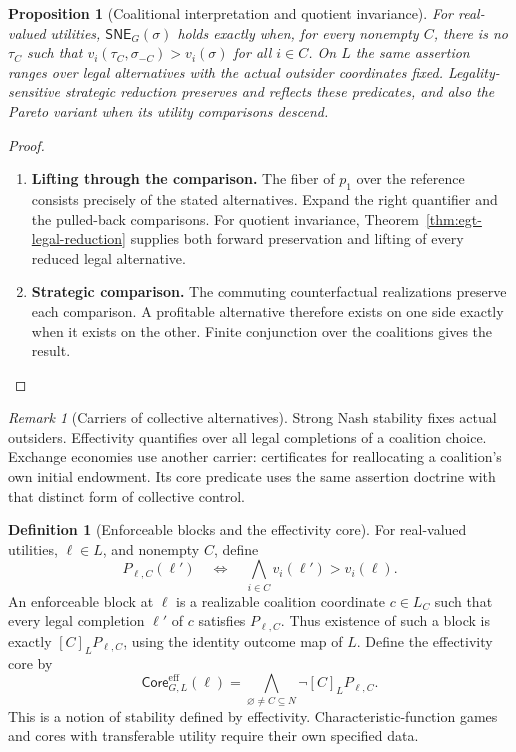 \documentclass[11pt,a4paper]{article}
\numberwithin{equation}{section}
\newtheorem{proposition}[theorem]{Proposition}
\theoremstyle{definition}
\newtheorem{definition}[theorem]{Definition}
\theoremstyle{remark}
\newtheorem{remark}[theorem]{Remark}
\theoremstyle{plain}
\begin{document}
\begin{proposition}[Coalitional interpretation and quotient invariance]
For real-valued utilities, $\mathsf{SNE}_G(\sigma)$ holds exactly when,
for every nonempty $C$, there is no $\tau_C$ such that
$v_i(\tau_C,\sigma_{-C})>v_i(\sigma)$ for all $i\in C$.
On $L$ the same assertion ranges over legal alternatives with the actual
outsider coordinates fixed. Legality-sensitive strategic reduction preserves
and reflects these predicates, and also the Pareto variant when its utility
comparisons descend.
\end{proposition}
\begin{proof}
\leavevmode
\begin{enumerate}[label=\textup{(\arabic*)},leftmargin=*,itemsep=4pt,topsep=3pt]
  \item \textbf{Lifting through the comparison.} The fiber of $p_1$ over the reference consists precisely of the stated
alternatives. Expand the right quantifier and the pulled-back comparisons. For quotient invariance, Theorem~\ref{thm:egt-legal-reduction} supplies
both forward preservation and lifting of every reduced legal alternative.
  \item \textbf{Strategic comparison.} The commuting counterfactual realizations preserve each comparison. A
profitable alternative therefore exists on one side exactly when it exists
on the other. Finite conjunction over the coalitions gives the result.
\end{enumerate}
\end{proof}

\begin{remark}[Carriers of collective alternatives]
Strong Nash stability fixes actual outsiders. Effectivity quantifies over
all legal completions of a coalition choice. Exchange economies use another carrier: certificates for reallocating
a coalition's own initial endowment. Its core predicate uses the same assertion doctrine
with that distinct form of collective control.
\end{remark}

\begin{definition}[Enforceable blocks and the effectivity core]
\label{def:egt-enforceable-blocks-and-the-effectivity-core}
For real-valued utilities, $\ell\in L$, and nonempty $C$, define
\[
 P_{\ell,C}(\ell')\quad\Longleftrightarrow\quad
                  \bigwedge_{i\in C}v_i(\ell')>v_i(\ell).
\]
An enforceable block at $\ell$ is a realizable coalition coordinate
$c\in L_C$ such that every legal completion $\ell'$ of $c$ satisfies
$P_{\ell,C}$. Thus existence of such a block is exactly
$[C]_L P_{\ell,C}$, using the identity outcome map of $L$.
Define the effectivity core by
\[
 \mathsf{Core}^{\mathrm{eff}}_{G,L}(\ell)
   =\bigwedge_{\varnothing\ne C\subseteq N}\neg[C]_L P_{\ell,C}.
\]
This is a notion of stability defined by effectivity.
Characteristic-function games and cores with transferable utility require
their own specified data.
\end{definition}
\end{document}
